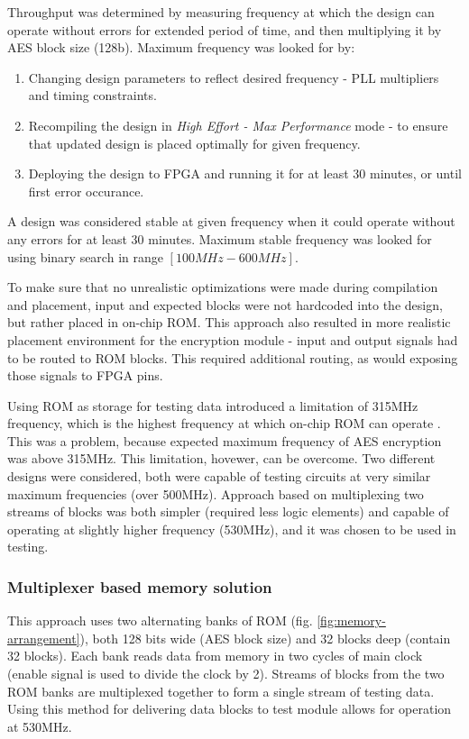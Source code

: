 Throughput was determined by measuring frequency at which the design can operate without errors for extended period of time, and then multiplying it by AES block size (128b). Maximum frequency was looked for by:
\begin{enumerate}[nolistsep]
\item Changing design parameters to reflect desired frequency - PLL multipliers and timing constraints.
\item Recompiling the design in \textit{High Effort - Max Performance} mode - to ensure that updated design is placed optimally for given frequency.
\item Deploying the design to FPGA and running it for at least 30 minutes, or until first error occurance.
\end{enumerate}
A design was considered stable at given frequency when it could operate without any errors for at least 30 minutes. Maximum stable frequency was looked for using binary search in range $[100MHz - 600MHz]$. 

To make sure that no unrealistic optimizations were made during compilation and placement, input and expected blocks were not hardcoded into the design, but rather placed in on-chip ROM. This approach also resulted in more realistic placement environment for the encryption module - input and output signals had to be routed to ROM blocks. This required additional routing, as would exposing those signals to FPGA pins. 

Using ROM as storage for testing data introduced a limitation of 315MHz frequency, which is the highest frequency at which on-chip ROM can operate \cite[Table 2-1]{altera-vol1} . This was a problem, because expected maximum frequency of AES encryption was above 315MHz. This limitation, hovewer, can be overcome. Two different designs were considered, both were capable of testing circuits at very similar maximum frequencies (over 500MHz). Approach based on multiplexing two streams of blocks was both simpler (required less logic elements) and capable of operating at slightly higher frequency (530MHz), and it was chosen to be used in testing.


\subsubsection{Multiplexer based memory solution}
This approach uses two alternating banks of ROM (fig. \ref{fig:memory-arrangement}), both 128 bits wide (AES block size) and 32 blocks deep (contain 32 blocks). Each bank reads data from memory in two cycles of main clock (enable signal is used to divide the clock by 2). Streams of blocks from the two ROM banks are multiplexed together to form a single stream of testing data. Using this method for delivering data blocks to test module allows for operation at 530MHz. 

